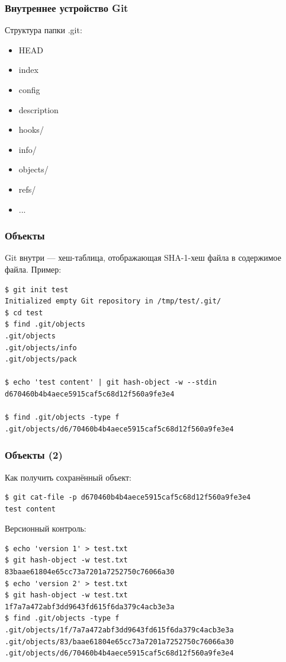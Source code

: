 \documentclass{../../slides-style}
\begin{document}
	\begin{frame}
		\frametitle{Внутреннее устройство Git}
		Структура папки .git:
		\begin{itemize}
			\item HEAD
			\item index
			\item config
			\item description
			\item hooks/
			\item info/
			\item objects/
			\item refs/
			\item ...
		\end{itemize}
	\end{frame}

	\begin{frame}[fragile]
		\frametitle{Объекты}
		Git внутри --- хеш-таблица, отображающая SHA-1-хеш файла в содержимое файла. Пример:
		\begin{verbatim}
$ git init test
Initialized empty Git repository in /tmp/test/.git/
$ cd test
$ find .git/objects
.git/objects
.git/objects/info
.git/objects/pack

$ echo 'test content' | git hash-object -w --stdin
d670460b4b4aece5915caf5c68d12f560a9fe3e4

$ find .git/objects -type f
.git/objects/d6/70460b4b4aece5915caf5c68d12f560a9fe3e4
		\end{verbatim}
	\end{frame}

	\begin{frame}[fragile]
		\frametitle{Объекты (2)}
		Как получить сохранённый объект:
		\begin{verbatim}
$ git cat-file -p d670460b4b4aece5915caf5c68d12f560a9fe3e4
test content
		\end{verbatim}

		Версионный контроль:
		\begin{verbatim}
$ echo 'version 1' > test.txt
$ git hash-object -w test.txt
83baae61804e65cc73a7201a7252750c76066a30
$ echo 'version 2' > test.txt
$ git hash-object -w test.txt
1f7a7a472abf3dd9643fd615f6da379c4acb3e3a
$ find .git/objects -type f
.git/objects/1f/7a7a472abf3dd9643fd615f6da379c4acb3e3a
.git/objects/83/baae61804e65cc73a7201a7252750c76066a30
.git/objects/d6/70460b4b4aece5915caf5c68d12f560a9fe3e4
		\end{verbatim}
	\end{frame}
\end{document}
